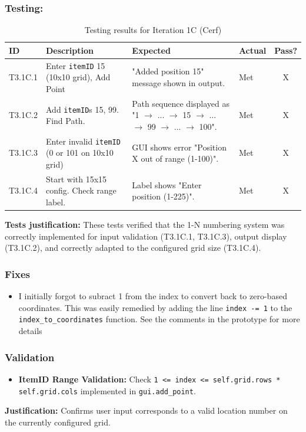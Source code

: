 \subsubsection{Testing:}
\begin{table}[htbp]
	\centering
	\begin{tabularx}{\textwidth}{|l|X|p{4.5cm}|p{1.5cm}|c|}
		\hline
		\textbf{ID} & \textbf{Description} & \textbf{Expected} & \textbf{Actual} & \textbf{Pass?} \\
		\hline
		T3.1C.1 & Enter \verb|itemID| 15 (10x10 grid), Add Point & "Added position 15" message shown in output. & Met & X \\
		\hline
		T3.1C.2 & Add \verb|itemID|s 15, 99. Find Path. & Path sequence displayed as "1 $ \rightarrow $ ... $ \rightarrow $ 15 $ \rightarrow $ ... $ \rightarrow $ 99 $ \rightarrow $ ... $ \rightarrow $ 100". & Met & X \\
		\hline
		T3.1C.3 & Enter invalid \verb|itemID| (0 or 101 on 10x10 grid) & GUI shows error "Position X out of range (1-100)". & Met & X \\
		\hline
		T3.1C.4 & Start with 15x15 config. Check range label. & Label shows "Enter position (1-225)". & Met & X \\
		\hline
	\end{tabularx}
	\caption{Testing results for Iteration 1C (Cerf)}
\end{table}
\textbf{Tests justification:} These tests verified that the 1-N numbering system was correctly implemented for input validation (T3.1C.1, T3.1C.3), output display (T3.1C.2), and correctly adapted to the configured grid size (T3.1C.4).

\subsubsection{Fixes}
\begin{itemize}
	\item I initially forgot to subract 1 from the index to convert back to zero-based coordinates. This was easily remedied by adding the line \verb|index -= 1| to the \verb*|index_to_coordinates| function. See the comments in the prototype for more details
\end{itemize}

\subsubsection{Validation}
\begin{itemize}
	\item \textbf{ItemID Range Validation:} Check \verb|1 <= index <= self.grid.rows * self.grid.cols| implemented in \verb|gui.add_point|.
\end{itemize}
\textbf{Justification:} Confirms user input corresponds to a valid location number on the currently configured grid.



